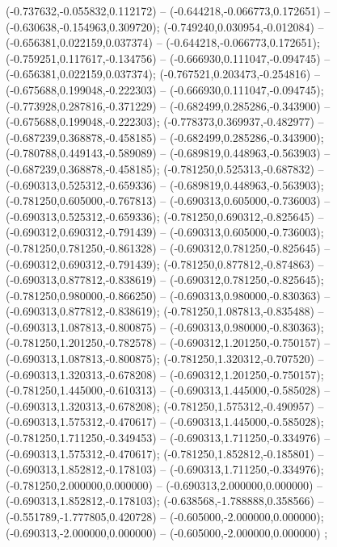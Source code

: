  (-0.737632,-0.055832,0.112172) -- (-0.644218,-0.066773,0.172651) -- (-0.630638,-0.154963,0.309720);
 (-0.749240,0.030954,-0.012084) -- (-0.656381,0.022159,0.037374) -- (-0.644218,-0.066773,0.172651);
 (-0.759251,0.117617,-0.134756) -- (-0.666930,0.111047,-0.094745) -- (-0.656381,0.022159,0.037374);
 (-0.767521,0.203473,-0.254816) -- (-0.675688,0.199048,-0.222303) -- (-0.666930,0.111047,-0.094745);
 (-0.773928,0.287816,-0.371229) -- (-0.682499,0.285286,-0.343900) -- (-0.675688,0.199048,-0.222303);
 (-0.778373,0.369937,-0.482977) -- (-0.687239,0.368878,-0.458185) -- (-0.682499,0.285286,-0.343900);
 (-0.780788,0.449143,-0.589089) -- (-0.689819,0.448963,-0.563903) -- (-0.687239,0.368878,-0.458185);
 (-0.781250,0.525313,-0.687832) -- (-0.690313,0.525312,-0.659336) -- (-0.689819,0.448963,-0.563903);
 (-0.781250,0.605000,-0.767813) -- (-0.690313,0.605000,-0.736003) -- (-0.690313,0.525312,-0.659336);
 (-0.781250,0.690312,-0.825645) -- (-0.690312,0.690312,-0.791439) -- (-0.690313,0.605000,-0.736003);
 (-0.781250,0.781250,-0.861328) -- (-0.690312,0.781250,-0.825645) -- (-0.690312,0.690312,-0.791439);
 (-0.781250,0.877812,-0.874863) -- (-0.690313,0.877812,-0.838619) -- (-0.690312,0.781250,-0.825645);
 (-0.781250,0.980000,-0.866250) -- (-0.690313,0.980000,-0.830363) -- (-0.690313,0.877812,-0.838619);
 (-0.781250,1.087813,-0.835488) -- (-0.690313,1.087813,-0.800875) -- (-0.690313,0.980000,-0.830363);
 (-0.781250,1.201250,-0.782578) -- (-0.690312,1.201250,-0.750157) -- (-0.690313,1.087813,-0.800875);
 (-0.781250,1.320312,-0.707520) -- (-0.690313,1.320313,-0.678208) -- (-0.690312,1.201250,-0.750157);
 (-0.781250,1.445000,-0.610313) -- (-0.690313,1.445000,-0.585028) -- (-0.690313,1.320313,-0.678208);
 (-0.781250,1.575312,-0.490957) -- (-0.690313,1.575312,-0.470617) -- (-0.690313,1.445000,-0.585028);
 (-0.781250,1.711250,-0.349453) -- (-0.690313,1.711250,-0.334976) -- (-0.690313,1.575312,-0.470617);
 (-0.781250,1.852812,-0.185801) -- (-0.690313,1.852812,-0.178103) -- (-0.690313,1.711250,-0.334976);
 (-0.781250,2.000000,0.000000) -- (-0.690313,2.000000,0.000000) -- (-0.690313,1.852812,-0.178103);
 (-0.638568,-1.788888,0.358566) -- (-0.551789,-1.777805,0.420728) -- (-0.605000,-2.000000,0.000000);
 (-0.690313,-2.000000,0.000000) -- (-0.605000,-2.000000,0.000000) ;

